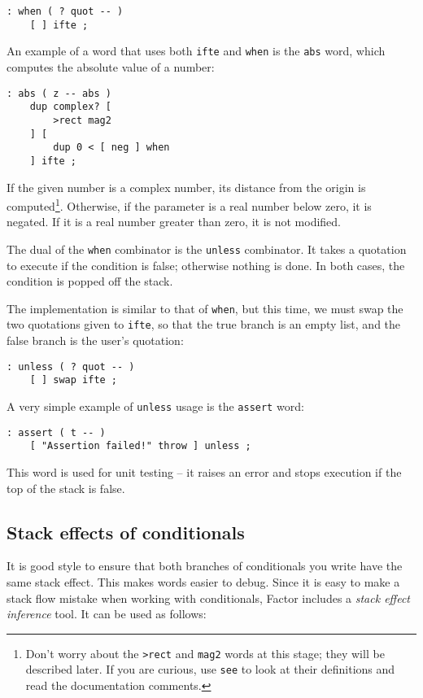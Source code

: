 \documentclass[english]{book}
\begin{document}
\begin{verbatim}
: when ( ? quot -- )
    [ ] ifte ;
\end{verbatim}

An example of a word that uses both \texttt{ifte} and \texttt{when} is the \texttt{abs} word, which computes the absolute value of a number:

\begin{verbatim}
: abs ( z -- abs )
    dup complex? [
        >rect mag2
    ] [
        dup 0 < [ neg ] when
    ] ifte ;
\end{verbatim}

If the given number is a complex number, its distance from the origin is computed\footnote{Don't worry about the \texttt{>rect} and \texttt{mag2} words at this stage; they will be described later. If you are curious, use \texttt{see} to look at their definitions and read the documentation comments.}. Otherwise, if the parameter is a real number below zero, it is negated. If it is a real number greater than zero, it is not modified.

The dual of the \texttt{when} combinator is the \texttt{unless} combinator. It takes a quotation to execute if the condition is false; otherwise nothing is done. In both cases, the condition is popped off the stack.

The implementation is similar to that of \texttt{when}, but this time, we must swap the two quotations given to \texttt{ifte}, so that the true branch is an empty list, and the false branch is the user's quotation:

\begin{verbatim}
: unless ( ? quot -- )
    [ ] swap ifte ;
\end{verbatim}

A very simple example of \texttt{unless} usage is the \texttt{assert} word:

\begin{verbatim}
: assert ( t -- )
    [ "Assertion failed!" throw ] unless ;
\end{verbatim}

This word is used for unit testing -- it raises an error and stops execution if the top of the stack is false.

\subsection{Stack effects of conditionals}

It is good style to ensure that both branches of conditionals you write have the same stack effect. This makes words easier to debug. Since it is easy to make a stack flow mistake when working with conditionals, Factor includes a \emph{stack effect inference} tool. It can be used as follows:
\end{document}
